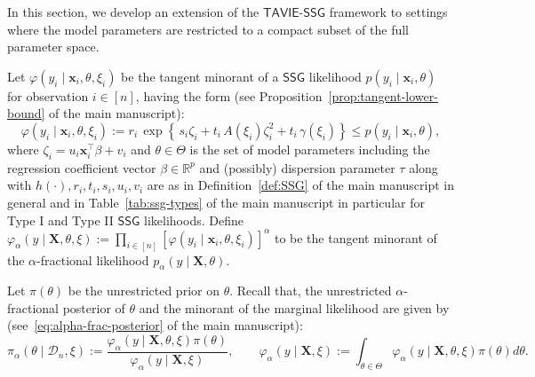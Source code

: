 \documentclass[12pt]{article}
\numberwithin{equation}{section}
\newcommand{\ssg}{\mathsf{SSG}}
\newcommand{\tssg}{\mathsf{TAVIE}\text{-}\mathsf{SSG}}
\begin{document}
In this section, we develop an extension of the $\tssg$ framework to settings where the model parameters are restricted to a compact subset of the full parameter space.

Let $\varphi(y_i \mid \mathbf{x}_i, \theta, \xi_i)$ be the tangent minorant of a $\ssg$ likelihood $p(y_i \mid \mathbf{x}_i, \theta)$ for observation $i \in [n]$, having the form (see Proposition~\ref{prop:tangent-lower-bound} of the main manuscript):
%
\begin{equation}\label{eq:compact-restrictin-0}
\varphi(y_i \mid \mathbf{x}_i, \theta, \xi_i) := r_i \, \exp \left\{\,s_i \zeta_i + t_i\,A(\xi_i)\zeta_i^2 + t_i\,\gamma(\xi_i)\right\} \leq p(y_i \mid \mathbf{x}_i, \theta),
\end{equation}
%
where $\zeta_i = u_i \mathbf{x}_i^{\top}\beta + v_i$ and $\theta\in \Theta$ is the set of model parameters including the regression coefficient vector $\beta \in \mathbb{R}^{p}$ and (possibly) dispersion parameter $\tau$ along with $h(\cdot), r_i, t_i, s_i, u_i, v_i$ are as in Definition~\ref{def:SSG} of the main manuscript in general and in Table~\ref{tab:ssg-types} of the main manuscript in particular for Type I and Type II $\ssg$ likelihoods. Define $\varphi_{\alpha}(y \mid \mathbf{X}, \theta, \xi) := \prod_{i \in [n]} \left[\varphi(y_i \mid \mathbf{x}_i, \theta, \xi_i)\right]^{\alpha}$ to be the tangent minorant of the $\alpha$-fractional likelihood $p_{\alpha}(y \mid \mathbf{X}, \theta)$. 

Let $\pi(\theta)$ be the unrestricted prior on $\theta$. Recall that, the unrestricted $\alpha$-fractional posterior of $\theta$ and the minorant of the marginal likelihood are given by (see~\eqref{eq:alpha-frac-posterior} of the main manuscript):
%
\begin{equation}\label{eq:compact-restriction-1}
\pi_{\alpha}(\theta \mid \mathcal{D}_n, \xi) := \frac{\varphi_{\alpha}(y \mid \mathbf{X}, \theta, \xi) \pi(\theta)}{\varphi_{\alpha}(y \mid \mathbf{X}, \xi)},
\qquad \varphi_{\alpha}(y \mid \mathbf{X}, \xi) := \int_{\theta \in \Theta} \varphi_{\alpha}(y \mid \mathbf{X}, \theta, \xi) \pi(\theta) d\theta.
\end{equation}
\end{document}
